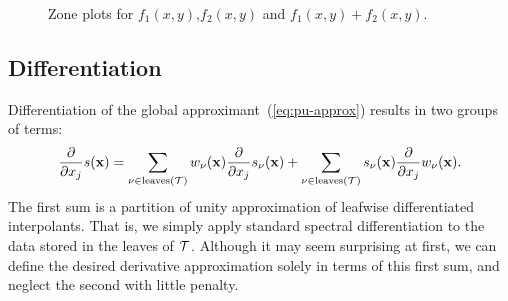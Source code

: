 \begin{figure}
 \caption{Zone plots for $f_1(x,y)$,$f_2(x,y)$ and $f_1(x,y)+f_2(x,y)$.}
\label{zone_tan}
\end{figure}
 




\subsection{Differentiation}

Differentiation of the global approximant~(\ref{eq:pu-approx}) results in two groups of terms:
\begin{equation*}
  \frac{\partial }{\partial x_j} s(\mathbf{x})=\sum_{\nu\in \text{leaves}(\mathcal{T})} w_\nu(\mathbf{x}) \frac{\partial }{\partial x_j} s_\nu(\mathbf{x})+\sum_{\nu\in \text{leaves}(\mathcal{T})} s_\nu(\mathbf{x}) \frac{\partial }{\partial x_j} w_\nu(\mathbf{x}).
\end{equation*}
The first sum is a partition of unity approximation of leafwise differentiated interpolants. That is, we simply apply standard spectral differentiation to the data stored in the leaves of $\mathcal{T}$. Although it may seem surprising at first, we can define the desired derivative approximation solely in terms of this first sum, and neglect the second with little penalty.

